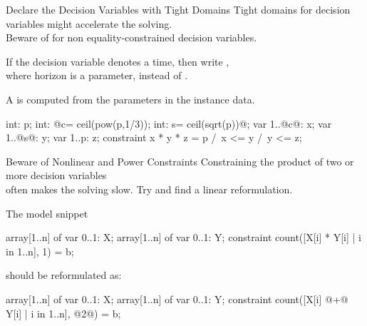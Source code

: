 \documentclass{cons-beamer}
\begin{document}
\begin{flashcardminizinc}
\begin{frame}[fragile]{Declare the Decision Variables with Tight Domains}\label{tight}
  \alert{Tight domains for decision variables might accelerate the
    solving. \\ Beware of  for non
    equality-constrained decision variables.} \vfill
  \begin{example}
    If the decision variable  denotes a time, then write
    , \\ 
    where horizon  is a parameter, instead of
    .
  \end{example}
  \vfill
  \begin{definition}
    A  is computed from the parameters in
    the instance data.
  \end{definition}
  \vfill
  \begin{example}
    \vspace{-2mm}
    \begin{mzn}
int: p; int: @c= ceil(pow(p,1/3)); int: s= ceil(sqrt(p))@;
var 1..@c@: x; var 1..@s@: y; var 1..p: z; %
constraint x * y * z = p /\ x <= y /\ y <= z;
    \end{mzn}
    \vspace{-2mm}
  \end{example}
\end{frame}

\begin{frame}[fragile]{Beware of Nonlinear and Power Constraints}
  \alert{Constraining the product of two or more decision variables \\
    often makes the solving slow.}  Try and find a linear
  reformulation.  \vfill
  \begin{example}
    The model snippet
    \begin{mznno}
  array[1..n] of var 0..1: X;
  array[1..n] of var 0..1: Y;
  constraint count([X[i] * Y[i] | i in 1..n], 1) = b;
    \end{mznno}
    should be reformulated as: 
    \begin{mznno}
  array[1..n] of var 0..1: X;
  array[1..n] of var 0..1: Y;
  constraint count([X[i] @+@ Y[i] | i in 1..n], @2@) = b;
    \end{mznno}
  \end{example}
  
\end{frame}


\end{flashcardminizinc}
\end{document}
